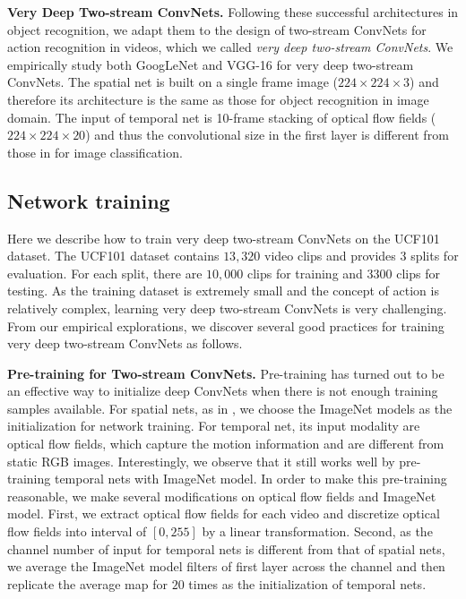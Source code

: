 \documentclass[10pt,twocolumn,letterpaper]{article}
\begin{document}
\textbf{Very Deep Two-stream ConvNets.} Following these successful architectures in object recognition, we adapt them to the design of two-stream ConvNets for action recognition in videos, which we called \emph{very deep two-stream ConvNets}. We empirically study both GoogLeNet and VGG-16 for very deep two-stream ConvNets. The spatial net is built on a single frame image ($224 \times 224 \times 3$) and therefore its architecture is the same as those for object recognition in image domain. The input of temporal net is 10-frame stacking of optical flow fields ($224 \times 224 \times 20$) and thus the convolutional size in the first layer is different from those in for image classification.

\subsection{Network training}
Here we describe how to train very deep two-stream ConvNets on the UCF101 dataset. The UCF101 dataset contains $13,320$ video clips and provides 3 splits for evaluation. For each split, there are $10,000$ clips for training and $3300$ clips for testing. As the training dataset is extremely small and the concept of action is relatively complex, learning very deep two-stream ConvNets is very challenging. From our empirical explorations, we discover several good practices for training very deep two-stream ConvNets as follows.

\textbf{Pre-training for Two-stream ConvNets.} Pre-training has turned out to be an effective way to initialize deep ConvNets when there is not enough training samples available. For spatial nets, as in \cite{SimonyanZ14}, we choose the ImageNet models as the initialization for network training. For temporal net, its input modality are optical flow fields, which capture the motion information and are different from static RGB images. Interestingly, we observe that it still works well by pre-training temporal nets with ImageNet model. In order to make this pre-training reasonable, we make several modifications on optical flow fields and ImageNet model. First, we extract optical flow fields for each video and discretize optical flow fields into interval of $[0,255]$ by a linear transformation. Second, as the channel number of input for temporal nets is different from that of spatial nets, we average the ImageNet model filters of first layer across the channel and then replicate the average map for $20$ times as the initialization of temporal nets.
\end{document}
